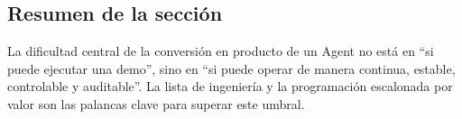 \subsection{Resumen de la sección}
La dificultad central de la conversión en producto de un Agent no está en ``si puede ejecutar una demo'', sino en ``si puede operar de manera continua, estable, controlable y auditable''. La lista de ingeniería y la programación escalonada por valor son las palancas clave para superar este umbral.

